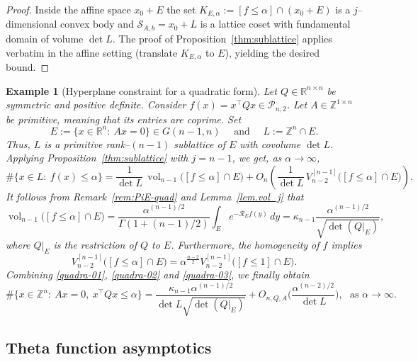 \documentclass[11pt]{article}
\newtheorem{example}[theorem]{Example}
\theoremstyle{definition}
\numberwithin{equation}{section}
\newcommand{\R}{\mathbb{R}}
\newcommand{\Z}{\mathbb{Z}}
\newcommand{\cP}{\mathcal{P}}        %
\DeclareMathOperator{\vol}{vol}
\begin{document}
\begin{proof}
Inside the affine space $x_0+E$ the set $K_{E,\alpha}:=[f\le\alpha]\cap(x_0+E)$ is a $j$–dimensional convex body and $\mathcal S_{A,b}=x_0+L$ is a lattice coset with fundamental domain of volume $\det L$. 
The proof of Proposition~\ref{thm:sublattice} applies verbatim in the affine setting (translate $K_{E,\alpha}$ to $E$), yielding the desired bound.
\end{proof}


\begin{example}[Hyperplane constraint for a quadratic form]\label{ex:hyperplane-quad}\normalfont
Let $Q\in\R^{n\times n}$ be symmetric and positive definite.
Consider $f(x)=x^\top Qx\in\cP_{n,2}$.  
Let $A\in\Z^{1\times n}$ be primitive, meaning that its entries are coprime.
Set
\[
E:=\{x\in\R^n:\ Ax=0\}\in G(n-1,n) \quad \text{ and } \quad L:=\Z^n\cap E.
\]
Thus, $L$ is a primitive rank--$(n - 1)$ sublattice of $E$ with covolume $\det L$.
Applying Proposition~\ref{thm:sublattice} with $j=n-1$, we get, as $\alpha \to \infty$,
\begin{equation}\label{quadra-01}
\#\{x\in L:\ f(x)\le\alpha\}
=\frac{1}{\det L}\,\vol_{n-1}\big([f\le\alpha]\cap E\big)
+O_{n}\!\left(\frac{1}{\det L}\,V_{n-2}^{[n - 1]}\big([f\le\alpha]\cap E\big)\right).
\end{equation}
It follows from Remark~\ref{rem:PiE-quad} and Lemma~\ref{lem.vol_j} that
\begin{equation}\label{quadra-02}
\vol_{n-1}\big([f\le \alpha]\cap E\big)
= \frac{\alpha^{(n - 1)/2}}{\Gamma(1+(n - 1)/2)}\int_E e^{-\mathscr R_E f(y)}\,dy=
\kappa_{n-1} \frac{\alpha^{(n - 1)/2}}{\sqrt{\det(Q|_E)}},
\end{equation}
where $Q|_E$ is the restriction of $Q$ to $E$. 
Furthermore, the homogeneity of $f$ implies
\begin{equation}\label{quadra-03}
    V_{n-2}^{[n - 1]} \big([f\le \alpha]\cap E\big)
    = \alpha^{\frac{n-2}{2}}V_{n-2}^{[n - 1]}\big([f\le 1]\cap E\big).
\end{equation}
Combining \eqref{quadra-01}, \eqref{quadra-02} and \eqref{quadra-03}, we finally obtain
\[
\#\{x\in\Z^n:\ Ax=0,\ x^\top Qx\le \alpha\}
= \frac{\kappa_{n-1} \alpha^{(n - 1)/2}}{\det L\sqrt{\det(Q|_E)}}
+ O_{n, Q, A}
\Big(\frac{\alpha^{(n - 2)/2}}{\det L}\Big), \,\, \text{ as } \alpha \to \infty.
\]
\end{example}


\subsection{Theta function asymptotics}
\end{document}
